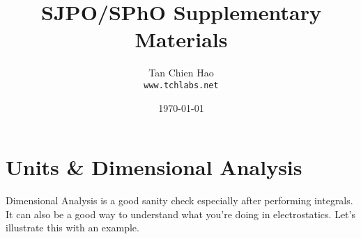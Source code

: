 \documentclass{article}
\title{SJPO/SPhO Supplementary Materials}
\author{
    Tan Chien Hao\\
    \texttt{www.tchlabs.net}
}
\date{\today}
\begin{document}
\maketitle

\section{Units \& Dimensional Analysis}
Dimensional Analysis is a good sanity check especially after performing integrals. It can also be a good way to understand what you're doing in electrostatics. Let's illustrate this with an example. 

\section{}
\end{document}
